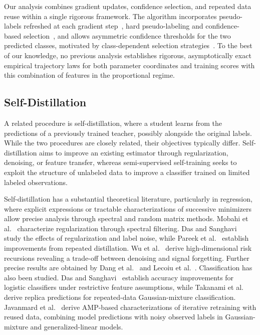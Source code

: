 Our analysis combines gradient updates, confidence selection,
and repeated data reuse within a single rigorous framework.
The algorithm incorporates pseudo-labels refreshed at each
gradient step~\cite{lee2013pseudolabel}, hard pseudo-labeling
and confidence-based selection~\cite{sohn2020fixmatch},
and allows asymmetric confidence thresholds for the two
predicted classes, motivated by class-dependent selection
strategies~\cite{zhang2021flexmatch}.
To the best of our knowledge, no previous analysis establishes
rigorous, asymptotically exact empirical trajectory laws for
both parameter coordinates and training scores with this
combination of features in the proportional regime.

\subsection{Self-Distillation}
\label{subsec:sd}

A related procedure is self-distillation, where a student learns
from the predictions of a previously trained teacher, possibly
alongside the original labels.
While the two procedures are closely related, their objectives
typically differ.
Self-distillation aims to improve an existing estimator through
regularization, denoising, or feature transfer, whereas
semi-supervised self-training seeks to exploit the structure
of unlabeled data to improve a classifier trained on limited
labeled observations.

Self-distillation has a substantial theoretical literature,
particularly in regression, where explicit expressions or
tractable characterizations of successive minimizers allow
precise analysis through spectral and random matrix methods.
Mobahi et al.~\cite{mobahi2020selfdistillation} characterize
regularization through spectral filtering.
Das and Sanghavi~\cite{das2023understanding} study the effects
of regularization and label noise, while Pareek et
al.~\cite{pareek2024understanding} establish improvements
from repeated distillation.
Wu et al.~\cite{wu2026selftraininghelpshurtsdenoising} derive
high-dimensional risk recursions revealing a trade-off between
denoising and signal forgetting.
Further precise results are obtained by Dang et al.~\cite{dang2026}
and Lecoiu et al.~\cite{lecoiu2026}.
Classification has also been studied.
Das and Sanghavi~\cite{das2023understanding} establish accuracy
improvements for logistic classifiers under restrictive feature
assumptions, while Takanami et al.~\cite{takanami2025effect}
derive replica predictions for repeated-data Gaussian-mixture
classification.
Javanmard et al.~\cite{javanmard2025selfboost} derive 
AMP-based characterizations of iterative retraining with reused data, 
combining model predictions with noisy observed labels in 
Gaussian-mixture and generalized-linear models.

